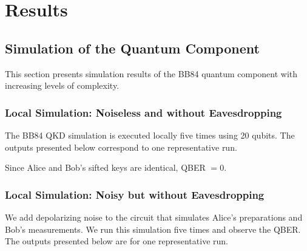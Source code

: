 \section{Results} \label{result}

\subsection{Simulation of the Quantum Component}

This section presents simulation results of the BB84 quantum component with increasing levels of complexity.

\subsubsection{Local Simulation: Noiseless and without Eavesdropping}

The BB84 QKD simulation is executed locally five times using 20 qubits. The outputs presented below correspond to one representative run.

\noindent
{}

Since Alice and Bob's sifted keys are identical, QBER $= 0$. 

\subsubsection{Local Simulation: Noisy but without Eavesdropping}

We add depolarizing noise to the circuit that simulates Alice's preparations and Bob's measurements.
We run this simulation five times and observe the QBER. The outputs presented below are for one representative run.


